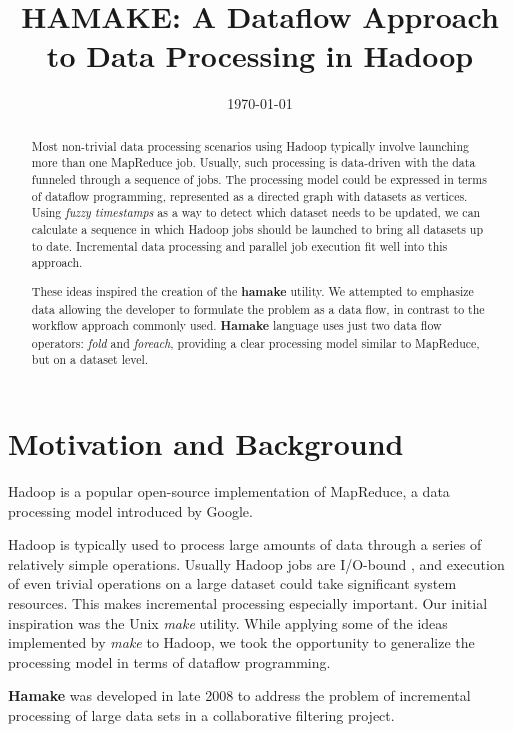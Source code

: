 \documentclass[10pt,conference,letterpaper]{IEEEtran}
\title{HAMAKE: A Dataflow Approach to Data Processing in Hadoop}
\author{\IEEEauthorblockN{Vadim Zaliva}
\IEEEauthorblockA{Codeminders\\
Email: lord@crocodile.org} \and \IEEEauthorblockN{Vladimir Orlov}
\IEEEauthorblockA{Codeminders\\
Email: vorl@codeminders.com}}
\date{\today}
\begin{document}
\lstset{language=XML,basicstyle=\tiny,markfirstintag=true,numbers=left,numbersep=1pt}

\maketitle

\begin{abstract}
  Most non-trivial data processing scenarios using Hadoop typically
  involve launching more than one MapReduce job. Usually, such
  processing is data-driven with the data funneled through a sequence
  of jobs.  The processing model could be expressed in terms of
  dataflow programming, represented as a directed graph with datasets
  as vertices. Using \textit{fuzzy timestamps} as a way to detect
  which dataset needs to be updated, we can calculate a sequence in
  which Hadoop jobs should be launched to bring all datasets up to
  date. Incremental data processing and parallel job execution fit
  well into this approach.

  These ideas inspired the creation of the \textbf{hamake} utility.    We attempted to emphasize data allowing the developer to formulate
  the problem as a data flow, in contrast to the workflow
  approach commonly used. \textbf{Hamake} language uses just two data
  flow operators: \emph{fold} and \emph{foreach}, providing a clear
  processing model similar to MapReduce, but on a dataset level.
\end{abstract}

\section{Motivation and Background}

Hadoop\cite{bialecki2005hadoop} is a popular  open-source implementation of MapReduce, a data processing model introduced by Google\cite{dean2008map}.

Hadoop is typically used to process large amounts of data through a series of relatively simple operations. Usually Hadoop jobs are I/O-bound
\cite{hadoopattwitter,hs2010hadoopbench}, and execution of even
trivial operations on a large dataset could take significant system
resources. This makes incremental processing especially important. Our initial
inspiration was the Unix \emph{make} utility. While applying some of the ideas implemented by \emph{make} to Hadoop, we took the opportunity to generalize the processing model in terms of dataflow programming.

\textbf{Hamake} was developed in late 2008 to address the problem of
incremental processing of large data sets in a collaborative filtering project.
\end{document}
